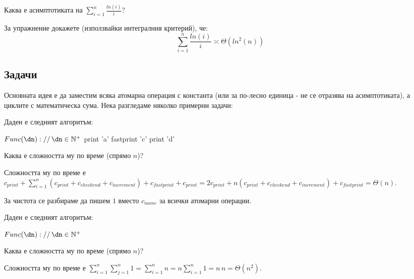 \begin{application}
	Каква е асимптотиката на $\sum\limits_{i=1}^n\frac{ln(i)}{i}$?
\end{application}
\begin{solution}
	За упражнение докажете (използвайки интегралния критерий), че:
	\begin{equation*}
		\sum\limits_{i=1}^n\frac{ln(i)}{i}\asymp\Theta(ln^2(n))
	\end{equation*}
\end{solution}\leavevmode\newline


\subsection{Задачи}

Основната идея е да заместим всяка атомарна операция с константа (или за по-лесно единица - не се отразява на асимптотиката), а циклите с математическа сума. Нека разгледаме няколко примерни задачи:\\

\begin{problem}
	Даден е следният алгоритъм:
	\begin{pseudocode}
		
		$Func(\dn)://\,\dn\in\mathbb{N}^+$
		\Mybegin
		{
			print 'a'\;
			fastprint 'c'\;
			print 'd'\;
		}
	\end{pseudocode}
	Каква е сложността му по време (спрямо $n$)?
\end{problem}
\begin{solution}
	Сложността му по време е $c_{print}+\sum\limits_{i=1}^n(c_{print}+c_{checkend}+c_{increment})+c_{fastprint}+c_{print}=2c_{print}+n(c_{print}+c_{checkend}+c_{increment})+c_{fastprint}=\Theta(n)$.
\end{solution}

\begin{remark*}
	За чистота се разбираме да пишем $1$ вместо $c_{name}$ за всички атомарни операции.
\end{remark*}\leavevmode\newline

\begin{problem}
	Даден е следният алгоритъм:
	\begin{pseudocode}
		\SetKwData{di}{i}
		\SetKwData{dj}{j}
		\SetKwData{dn}{n}
		
		$Func(\dn)://\,\dn\in\mathbb{N}^+$
		\Mybegin
		{
			\Myfor{$\di\leftarrow1$ \KwTo $\dn$}
			{
				\Myfor{$\dj\leftarrow1$ \KwTo $\dn$}{print 'a'\;}
			}
		}
	\end{pseudocode}
	Каква е сложността му по време (спрямо $n$)?
\end{problem}
\begin{solution}
	Сложността му по време е $\sum\limits_{i=1}^n\sum\limits_{j=1}^n1=\sum\limits_{i=1}^n n=n\sum\limits_{i=1}^n 1=n\,n=\Theta(n^2)$.
\end{solution}\leavevmode\newline

